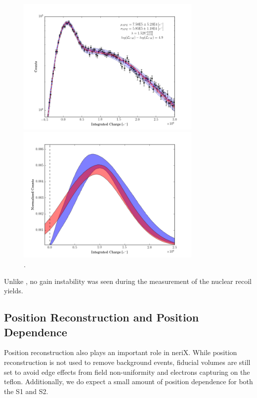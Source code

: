 \begin{figure}[p]
	\centering
	\includegraphics[width=0.8\textwidth]{nerix_pmt_best_fit}
	\caption{.}
	\label{fig:nerix_pmt_best_fit}

        \vspace{\floatsep}

	\centering
	\includegraphics[width=0.8\textwidth]{nerix_spe_response}
	\caption{.}
	\label{fig:nerix_spe_response}
\end{figure}


Unlike , no gain instability was seen during the measurement of the nuclear recoil yields.


\subsection{Position Reconstruction and Position Dependence}

Position reconstruction also plays an important role in neriX.  While position reconstruction is not used to remove background events, fiducial volumes are still set to avoid edge effects from field non-uniformity and electrons capturing on the teflon.  Additionally, we do expect a small amount of position dependence for both the S1 and S2.  

